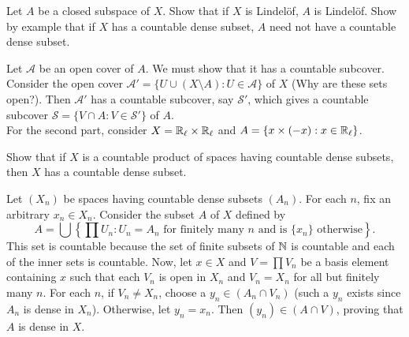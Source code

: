 
	\setcounter{exercise}{8}
	\begin{exercise}
		Let $A$ be a closed subspace of $X$. Show that if $X$ is Lindel\"{o}f, $A$ is Lindel\"{o}f. Show by example that if $X$ has a countable dense subset, $A$ need not have a countable dense subset.
	\end{exercise}
	\begin{solution*}
		Let $\mathcal{A}$ be an open cover of $A$. We must show that it has a countable subcover. Consider the open cover $\mathcal{A}' = \{U \cup (X\setminus A) : U\in\mathcal{A}\}$ of $X$ (Why are these sets open?). Then $\mathcal{A}'$ has a countable subcover, say $\mathcal{S}'$, which gives a countable subcover $\mathcal{S} = \{V \cap A : V\in\mathcal{S}'\}$ of $A$.\\
		For the second part, consider $X = \mathbb{R}_\ell \times \mathbb{R}_\ell$ and $A = \{ x \times (-x) : x \in \mathbb{R}_\ell\}$. 
	\end{solution*}

	\begin{exercise}
		Show that if $X$ is a countable product of spaces having countable dense subsets, then $X$ has a countable dense subset.
	\end{exercise}
	\begin{solution*}
		Let $(X_n)$ be spaces having countable dense subsets $(A_n)$. For each $n$, fix an arbitrary $x_n \in X_n$. Consider the subset $A$ of $X$ defined by
		\[ A = \bigcup \left\{ \prod U_n : U_n=A_n \text{ for finitely many $n$ and is $\{x_n\}$ otherwise} \right\}. \]
		This set is countable because the set of finite subsets of $\mathbb{N}$ is countable and each of the inner sets is countable. Now, let $x \in X$ and $V = \prod V_n$ be a basis element containing $x$ such that each $V_n$ is open in $X_n$ and $V_n = X_n$ for all but finitely many $n$. For each $n$, if $V_n \neq X_n$, choose a $y_n \in (A_n \cap V_n)$ (such a $y_n$ exists since $A_n$ is dense in $X_n$). Otherwise, let $y_n = x_n$. Then $(y_n) \in (A \cap V)$, proving that $A$ is dense in $X$.
	\end{solution*}


